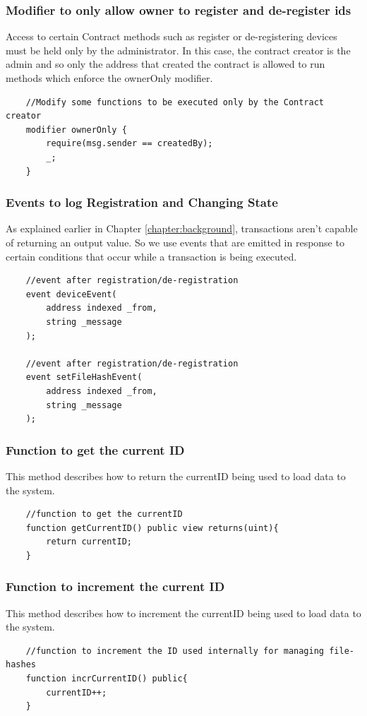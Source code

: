 \documentclass[11pt,openright]{report}
\begin{document}
\subsubsection{Modifier to only allow owner to register and de-register ids}
Access to certain Contract methods such as register or de-registering devices must be held only by the administrator. In this case, the contract creator is the admin and so only the address that created the contract is allowed to run methods which enforce the ownerOnly modifier.
\begin{verbatim}
    //Modify some functions to be executed only by the Contract creator
    modifier ownerOnly {
        require(msg.sender == createdBy);
        _;
    }
\end{verbatim}

\subsubsection{Events to log Registration and Changing State}
As explained earlier in Chapter \ref{chapter:background}, transactions aren't capable of returning an output value. So we use events that are emitted in response to certain conditions that occur while a transaction is being executed.

\begin{verbatim}
    //event after registration/de-registration
    event deviceEvent(
        address indexed _from,
        string _message
    );
    
    //event after registration/de-registration
    event setFileHashEvent(
        address indexed _from,
        string _message
    );
\end{verbatim}

\subsubsection{Function to get the current ID}
This method describes how to return the currentID being used to load data to the system.
\begin{verbatim}
    //function to get the currentID
    function getCurrentID() public view returns(uint){
        return currentID;
    }
\end{verbatim}
\subsubsection{Function to increment the current ID}
This method describes how to increment the currentID being used to load data to the system.
\begin{verbatim}
    //function to increment the ID used internally for managing file-hashes
    function incrCurrentID() public{
        currentID++;
    }
\end{verbatim}
\end{document}

